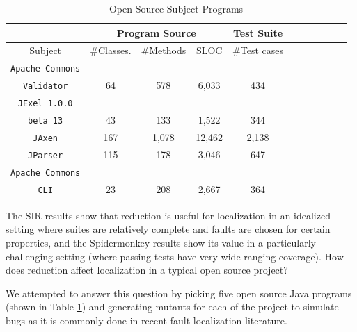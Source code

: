 


\begin{table}
{\scriptsize
\begin{center}
\begin{tabular}{|c||c|c|c|c|c||c|c|c|c|c|}
\hline
\hline
& \multicolumn{3}{|c|}{Program Source} & \multicolumn{1}{|c|}{Test Suite} \\
\hline
Subject & \#Classes. & \#Methods & SLOC & \#Test cases \\
\hline
\hline
{\tt Apache Commons} & & & & \\
{\tt Validator} & 64 & 578 & 6,033 & 434 \\
\hline
{\tt JExel 1.0.0} & & & & \\
{\tt beta 13} & 43 & 133 & 1,522	 & 344  \\
\hline
{\tt JAxen} & 167 & 1,078 & 12,462 & 2,138\\
\hline
{\tt JParser} & 115 & 178 & 3,046 & 647 \\
\hline
{\tt Apache Commons} & & & & \\
{\tt CLI} & 23 & 208 & 2,667 & 364 \\ 
\hline
\hline
\end{tabular}
\end{center}
}
\caption{Open Source Subject Programs}
\label{tab:opensourcesubs}
\end{table}



The SIR results show that reduction is useful for localization in an
idealized setting where suites are relatively complete and faults are
chosen for certain properties, and the Spidermonkey results show its
value in a particularly challenging setting (where passing tests have
very wide-ranging coverage).  How does reduction affect localization
in a typical open source project?

We attempted to answer this question by picking five open source Java
programs (shown in Table \ref{tab:opensourcesubs}) and generating mutants for each of the project to simulate bugs as it is commonly done in recent fault localization literature.\cite{mutant} \cite{PureTest}



